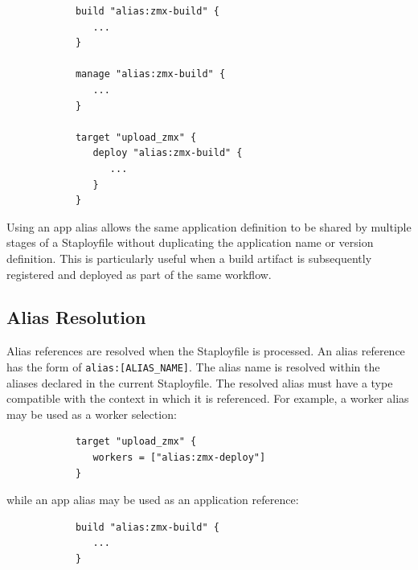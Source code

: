 \documentclass[11pt,a4paper]{article}
\begin{document}
    \begin{center}
        \begin{verbatim}
            build "alias:zmx-build" {
               ...
            }

            manage "alias:zmx-build" {
               ...
            }

            target "upload_zmx" {
               deploy "alias:zmx-build" {
                  ...
               }
            }
        \end{verbatim}
    \end{center}

    Using an app alias allows the same application definition to be shared by multiple stages of a Staployfile without duplicating the application name or version definition.
    This is particularly useful when a build artifact is subsequently registered and deployed as part of the same workflow.

    \subsection{Alias Resolution}\label{subsec:alias-resolution}

    Alias references are resolved when the Staployfile is processed.
    An alias reference has the form of \texttt{alias:[ALIAS\_NAME]}.
    The alias name is resolved within the aliases declared in the current Staployfile.
    The resolved alias must have a type compatible with the context in which it is referenced.
    For example, a worker alias may be used as a worker selection:

    \begin{center}
        \begin{verbatim}
            target "upload_zmx" {
               workers = ["alias:zmx-deploy"]
            }
        \end{verbatim}
    \end{center}

    while an app alias may be used as an application reference:

    \begin{center}
        \begin{verbatim}
            build "alias:zmx-build" {
               ...
            }
        \end{verbatim}
    \end{center}
\end{document}
